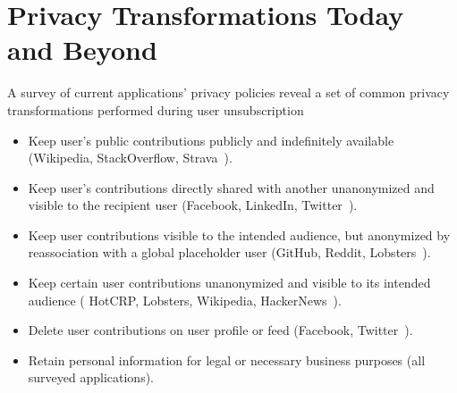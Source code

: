 \section{Privacy Transformations Today and Beyond}
\label{sec:survey}
A survey of current applications' privacy policies reveal a set of common privacy transformations performed during user unsubscription
\begin{itemize}[nosep]
    \item Keep user's public contributions publicly and indefinitely available (\eg Wikipedia,
        StackOverflow, Strava~\cite{wikipedia:privacy, stackoverflow:privacy, strava:privacy}).
    \item Keep user's contributions directly shared with another unanonymized and visible to the recipient user (\eg Facebook,
        LinkedIn, Twitter~\cite{twitter:privacy, facebook:privacy, linkedin:privacy}).
    \item Keep user contributions visible to the intended audience, but anonymized by reassociation with a global
        placeholder user (\eg GitHub, Reddit, Lobsters~\cite{github:privacy, reddit:privacy,
        lobsters:privacy}).
    \item Keep certain user contributions unanonymized and visible to its intended audience (\eg
        HotCRP, Lobsters, Wikipedia, HackerNews~\cite{hotcrp:privacy, lobsters:privacy,
        hackernews:privacy, wikipedia:privacy}).
    \item Delete user contributions on user profile or feed (\eg Facebook,
        Twitter~\cite{facebook:privacy, twitter:privacy}).
    \item Retain personal information for legal or necessary business purposes (all surveyed applications).
\end{itemize}

